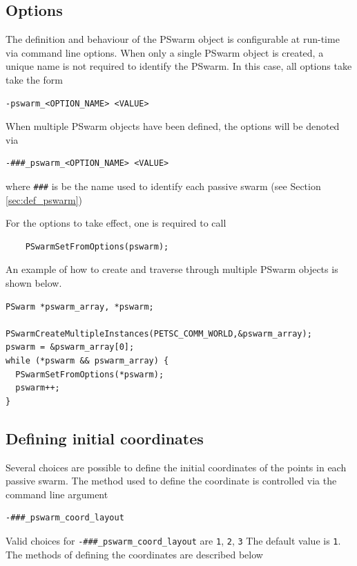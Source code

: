 \documentclass[paper=a4, fontsize=10pt,twoside]{scrartcl}
\begin{document}
{{\subsection{Options}
The definition and behaviour of the PSwarm object is configurable at run-time via command line options.
When only a single PSwarm object is created, a unique name is not required to identify the PSwarm.
In this case, all options take take the form
\begin{lstlisting}
-pswarm_<OPTION_NAME> <VALUE>
\end{lstlisting}
When multiple PSwarm objects have been defined, the options will be denoted via
\begin{lstlisting}
-###_pswarm_<OPTION_NAME> <VALUE>
\end{lstlisting}
where \texttt{\#\#\#} is be the name used to identify each passive swarm (see Section \ref{sec:def_pswarm})

For the options to take effect, one is required to call
\begin{lstlisting}
    PSwarmSetFromOptions(pswarm);
\end{lstlisting}
An example of how to create and traverse through multiple PSwarm objects is shown below.
\begin{lstlisting}
PSwarm *pswarm_array, *pswarm;

PSwarmCreateMultipleInstances(PETSC_COMM_WORLD,&pswarm_array);
pswarm = &pswarm_array[0];
while (*pswarm && pswarm_array) {
  PSwarmSetFromOptions(*pswarm);
  pswarm++;
}
\end{lstlisting}



\subsection{Defining initial coordinates}

Several choices are possible to define the initial coordinates of the points in each passive swarm.
The method used to define the coordinate is controlled via the command line argument
\begin{lstlisting}
-###_pswarm_coord_layout
\end{lstlisting}

Valid choices for \texttt{-\#\#\#\_pswarm\_coord\_layout} are \texttt{1}, \texttt{2}, \texttt{3}
The default value is \texttt{1}.
The methods of defining the coordinates are described below


}}
\end{document}
